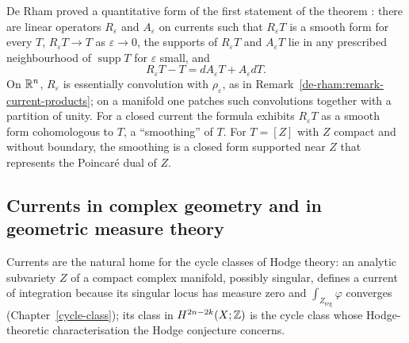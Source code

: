 \begin{remark}\label{de-rham:remark-regularisation}
De Rham proved a quantitative form of the first statement of the theorem \cite{de-rham-book}: there are linear operators $R_\varepsilon$ and $A_\varepsilon$ on currents such that $R_\varepsilon T$ is a
smooth form for every $T$, $R_\varepsilon T \to T$ as $\varepsilon \to 0$, the supports of $R_\varepsilon T$ and $A_\varepsilon T$ lie in any prescribed neighbourhood of $\operatorname{supp}T$ for $\varepsilon$
small, and
\[
R_\varepsilon T - T = dA_\varepsilon T + A_\varepsilon dT .
\]
On $\mathbb{R}^n$, $R_\varepsilon$ is essentially convolution with $\rho_\varepsilon$, as in Remark~\ref{de-rham:remark-current-products}; on a manifold one patches such convolutions together with a partition of unity. For a closed
current the formula exhibits $R_\varepsilon T$ as a smooth form cohomologous to $T$, a ``smoothing'' of $T$. For $T = [Z]$ with $Z$ compact and without boundary, the smoothing is a closed form supported near $Z$ that
represents the Poincar\'e dual of $Z$.
\end{remark}

\subsection{Currents in complex geometry and in geometric measure theory}\label{de-rham:subsection-currents-further}

\begin{remark}\label{de-rham:remark-cycle-classes}
Currents are the natural home for the cycle classes of Hodge theory: an analytic subvariety $Z$ of a compact complex manifold, possibly singular, defines a current of integration because its singular locus
has measure zero and $\int_{Z_{\mathrm{reg}}}\varphi$ converges (Chapter~\ref{cycle-class}); its class in $H^{2n-2k}(X; \mathbb{Z})$ is the cycle class whose Hodge-theoretic characterisation the Hodge conjecture
concerns.
\end{remark}

